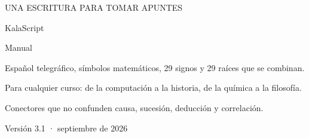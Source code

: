 \documentclass[11pt,a4paper]{article}
\begin{document}
\hypersetup{pageanchor=false}
\begin{titlepage}
\thispagestyle{empty}
\vspace*{12mm}
{\sffamily\small\color{KalaAcento}\MakeUppercase{Una escritura para tomar apuntes}}\par
\vspace{15mm}
{\fontsize{51}{58}\selectfont\color{KalaTinta}KalaScript}\par
\vspace{5mm}
{\Large\color{KalaSuave}Manual}\par
\vspace{16mm}
\hspace{6mm}\hspace{6mm}\hspace{6mm}\par
\vfill
\begin{minipage}{.78\textwidth}
Español telegráfico, símbolos matemáticos, 29 signos y 29 raíces que se combinan.\par
Para cualquier curso: de la computación a la historia, de la química a la filosofía.\par
Conectores que no confunden causa, sucesión, deducción y correlación.
\end{minipage}
\vspace{15mm}\par
{\small\sffamily\color{KalaSuave}Versión 3.1 · septiembre de 2026}
\end{titlepage}
\hypersetup{pageanchor=true}
\tableofcontents
\clearpage
{}

\clearpage

\clearpage

\clearpage

\clearpage

\clearpage

\clearpage

\clearpage

\clearpage

\clearpage

\clearpage
\appendix

\clearpage

\end{document}

